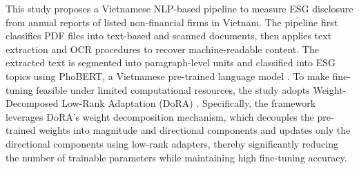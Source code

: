 \documentclass{article}
\theoremstyle{plain}
\theoremstyle{definition}
\theoremstyle{remark}
\begin{document}


This study proposes a Vietnamese NLP-based pipeline to measure ESG disclosure from annual reports of listed non-financial firms in Vietnam. The pipeline first classifies PDF files into text-based and scanned documents, then applies text extraction and OCR procedures to recover machine-readable content. The extracted text is segmented into paragraph-level units and classified into ESG topics using PhoBERT, a Vietnamese pre-trained language model \citep{nguyen2020phobert}. To make fine-tuning feasible under limited computational resources, the study adopts Weight-Decomposed Low-Rank Adaptation (DoRA) \citep{liu2024dora}. Specifically, the framework leverages DoRA's weight decomposition mechanism, which decouples the pre-trained weights into magnitude and directional components and updates only the directional components using low-rank adapters, thereby significantly reducing the number of trainable parameters while maintaining high fine-tuning accuracy.
\end{document}
